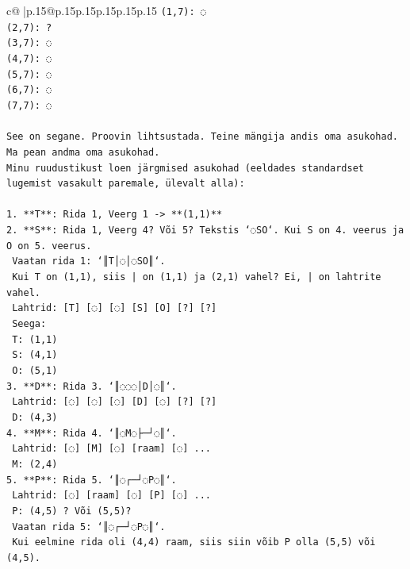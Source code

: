 \documentclass{article}
\begin{document}
{\begin{supertabular}{c@{$\;$}|p{.15\linewidth}@{}p{.15\linewidth}p{.15\linewidth}p{.15\linewidth}p{.15\linewidth}p{.15\linewidth}}
{{{\texttt{(1,7): ◌} \\
\texttt{(2,7): ?} \\
\texttt{(3,7): ◌} \\
\texttt{(4,7): ◌} \\
\texttt{(5,7): ◌} \\
\texttt{(6,7): ◌} \\
\texttt{(7,7): ◌} \\
\\ 
\texttt{See on segane. Proovin lihtsustada. Teine mängija andis oma asukohad. Ma pean andma oma asukohad.} \\
\texttt{Minu ruudustikust loen järgmised asukohad (eeldades standardset lugemist vasakult paremale, ülevalt alla):} \\
\\ 
\texttt{1.  **T**: Rida 1, Veerg 1 {-}> **(1,1)**} \\
\texttt{2.  **S**: Rida 1, Veerg 4? Või 5? Tekstis `◌SO`. Kui S on 4. veerus ja O on 5. veerus.} \\
\texttt{    Vaatan rida 1: `║T│◌│◌SO║`.} \\
\texttt{    Kui T on (1,1), siis | on (1,1) ja (2,1) vahel? Ei, | on lahtrite vahel.} \\
\texttt{    Lahtrid: {[}T{]} {[}◌{]} {[}◌{]} {[}S{]} {[}O{]} {[}?{]} {[}?{]}} \\
\texttt{    Seega:} \\
\texttt{    T: (1,1)} \\
\texttt{    S: (4,1)} \\
\texttt{    O: (5,1)} \\
\texttt{3.  **D**: Rida 3. `║◌◌◌│D│◌║`.} \\
\texttt{    Lahtrid: {[}◌{]} {[}◌{]} {[}◌{]} {[}D{]} {[}◌{]} {[}?{]} {[}?{]}} \\
\texttt{    D: (4,3)} \\
\texttt{4.  **M**: Rida 4. `║◌M◌├─┘◌║`.} \\
\texttt{    Lahtrid: {[}◌{]} {[}M{]} {[}◌{]} {[}raam{]} {[}◌{]} ...} \\
\texttt{    M: (2,4)} \\
\texttt{5.  **P**: Rida 5. `║◌┌─┘◌P◌║`.} \\
\texttt{    Lahtrid: {[}◌{]} {[}raam{]} {[}◌{]} {[}P{]} {[}◌{]} ...} \\
\texttt{    P: (4,5) ? Või (5,5)?} \\
\texttt{    Vaatan rida 5: `║◌┌─┘◌P◌║`.} \\
\texttt{    Kui eelmine rida oli (4,4) raam, siis siin võib P olla (5,5) või (4,5).} \\
}}}
\end{supertabular}}
\end{document}
